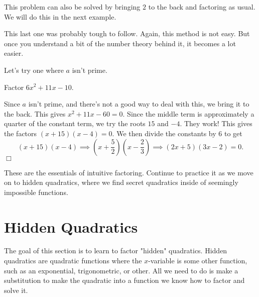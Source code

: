 \documentclass[lang=en,11pt]{elegantbook}
\begin{document}
\begin{remark}
  This problem can also be solved by bringing $2$ to the back and factoring as usual.  We will do this in the next example.
\end{remark}
This last one was probably tough to follow.  Again, this method is not easy.  But once you understand a bit of the number theory behind it, it becomes a lot easier.

Let's try one where $a$ isn't prime.
\begin{example}
Factor $6x^2+11x-10$.
\end{example}
\begin{solution}
Since $a$ isn't prime, and there's not a good way to deal with this, we bring it to the back.  This gives $x^2+11x-60=0$.  Since the middle term is approximately a quarter of the constant term, we try the roots $15$ and $-4$.  They work!  This gives the factors $(x+15)(x-4)=0$.  We then divide the constants by $6$ to get $$(x+15)(x-4)\implies \left(x+\dfrac{5}{2}\right)\left(x-\dfrac{2}{3}\right)\implies (2x+5)(3x-2)=0.$$ $\Box$
\end{solution}
These are the essentials of intuitive factoring.  Continue to practice it as we move on to hidden quadratics, where we find secret quadratics inside of seemingly impossible functions.
\section{Hidden Quadratics}
\noindent The goal of this section is to learn to factor "hidden" quadratics.  Hidden quadratics are quadratic functions where the $x$-variable is some other function, such as an exponential, trigonometric, or other.  All we need to do is make a substitution to make the quadratic into a function we know how to factor and solve it.
\end{document}
